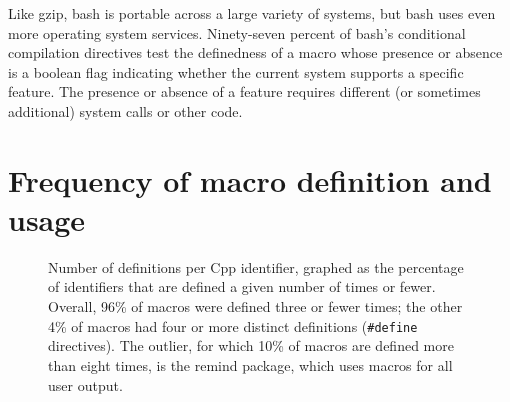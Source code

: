 \documentclass[11pt]{article}
\newcommand{\pkg}[1]{\textsf{#1}}
\begin{document}
Like \pkg{gzip}, \pkg{bash} is portable across a large variety of
systems, but \pkg{bash} uses even more operating system services.
Ninety-seven percent of \pkg{bash}'s conditional compilation directives
test the definedness of a macro whose presence or absence is a boolean
flag indicating whether the current system supports a specific feature.
The presence or absence of a feature requires different (or sometimes
additional) system calls or other code.


\section{Frequency of macro definition and usage}
\label{sec:usage}


%
%



\begin{figure}
\centerline{}
\caption{Number of definitions per Cpp identifier, graphed as
  the percentage of identifiers that are defined a given number of times
  or fewer.  Overall, 96\% of macros were defined three or
  fewer times; the other 4\% of macros had four or more distinct
  definitions ({\tt \#define} directives).  The outlier, for which 10\% of
  macros are defined more than eight times, is the \pkg{remind}
  package, which uses macros for all user output.}
\label{fig:freq-def}
\end{figure}
\end{document}
